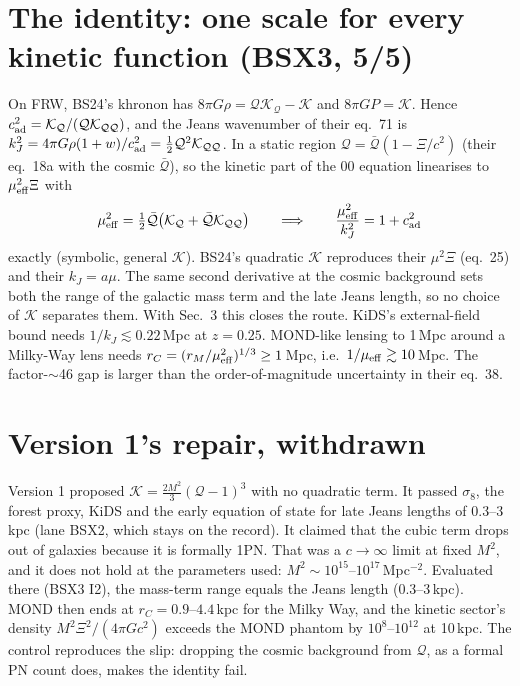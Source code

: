 \documentclass[10pt]{article}
\begin{document}
\section{The identity: one scale for every kinetic function (BSX3, 5/5)}
On FRW, BS24's khronon has $8\pi G\rho=\mathcal Q\mathcal K_{\mathcal Q}-\mathcal K$ and $8\pi G P=\mathcal K$. Hence $c_{\rm ad}^2=\mathcal K_{\mathcal Q}/(\mathcal Q\mathcal K_{\mathcal{QQ}})$, and the Jeans wavenumber of their eq.~71 is $k_J^2=4\pi G\rho(1+w)/c_{\rm ad}^2=\tfrac12\mathcal Q^2\mathcal K_{\mathcal{QQ}}$.
In a static region $\mathcal Q=\bar{\mathcal Q}(1-\Xi/c^2)$ (their eq.~18a with the cosmic $\bar{\mathcal Q}$), so the kinetic part of the 00 equation linearises to $\mu_{\rm eff}^2\Xi$ with
\begin{equation}
\mu_{\rm eff}^2=\tfrac12\bar{\mathcal Q}\big(\mathcal K_{\mathcal Q}+\bar{\mathcal Q}\mathcal K_{\mathcal{QQ}}\big)\qquad\Longrightarrow\qquad \frac{\mu_{\rm eff}^2}{k_J^2}=1+c_{\rm ad}^2
\end{equation}
exactly (symbolic, general $\mathcal K$). BS24's quadratic $\mathcal K$ reproduces their $\mu^2\Xi$ (eq.~25) and their $k_J=a\mu$.
The same second derivative at the cosmic background sets both the range of the galactic mass term and the late Jeans length, so no choice of $\mathcal K$ separates them.
With Sec.~3 this closes the route. KiDS's external-field bound needs $1/k_J\lesssim0.22$\,Mpc at $z=0.25$. MOND-like lensing to 1\,Mpc around a Milky-Way lens needs $r_C=(r_M/\mu_{\rm eff}^2)^{1/3}\geq1$\,Mpc, i.e.\ $1/\mu_{\rm eff}\gtrsim10$\,Mpc. The factor-$\sim$46 gap is larger than the order-of-magnitude uncertainty in their eq.~38.

\section{Version 1's repair, withdrawn}
Version 1 proposed $\mathcal K=\tfrac{2M^2}{3}(\mathcal Q-1)^3$ with no quadratic term. It passed $\sigma_8$, the forest proxy, KiDS and the early equation of state for late Jeans lengths of 0.3--3\,kpc (lane BSX2, which stays on the record).
It claimed that the cubic term drops out of galaxies because it is formally 1PN. That was a $c\to\infty$ limit at fixed $M^2$, and it does not hold at the parameters used: $M^2\sim10^{15}$--$10^{17}$\,Mpc$^{-2}$.
Evaluated there (BSX3 I2), the mass-term range equals the Jeans length (0.3--3\,kpc). MOND then ends at $r_C=0.9$--$4.4$\,kpc for the Milky Way, and the kinetic sector's density $M^2\Xi^2/(4\pi Gc^2)$ exceeds the MOND phantom by $10^8$--$10^{12}$ at 10\,kpc.
The control reproduces the slip: dropping the cosmic background from $\mathcal Q$, as a formal PN count does, makes the identity fail.
\end{document}
